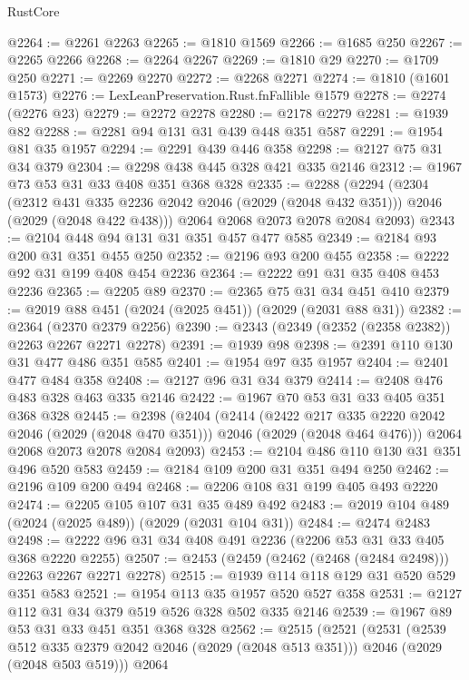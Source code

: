 \begin{lexlean}{RustCore}
\begin{coremodule}
@2264 := @2261 @2263
@2265 := @1810 @1569
@2266 := @1685 @250
@2267 := @2265 @2266
@2268 := @2264 @2267
@2269 := @1810 @29
@2270 := @1709 @250
@2271 := @2269 @2270
@2272 := @2268 @2271
@2274 := @1810 (@1601 @1573)
@2276 := LexLeanPreservation.Rust.fnFallible @1579
@2278 := @2274 (@2276 @23)
@2279 := @2272 @2278
@2280 := @2178 @2279
@2281 := @1939 @82
@2288 := @2281 @94 @131 @31 @439 @448 @351 @587
@2291 := @1954 @81 @35 @1957
@2294 := @2291 @439 @446 @358
@2298 := @2127 @75 @31 @34 @379
@2304 := @2298 @438 @445 @328 @421 @335 @2146
@2312 := @1967 @73 @53 @31 @33 @408 @351 @368 @328
@2335 := @2288
    (@2294
      (@2304
        (@2312 @431 @335 @2236 @2042 @2046 (@2029 (@2048 @432 @351)))
        @2046
        (@2029 (@2048 @422 @438)))
      @2064
      @2068
      @2073
      @2078
      @2084
      @2093)
@2343 := @2104 @448 @94 @131 @31 @351 @457 @477 @585
@2349 := @2184 @93 @200 @31 @351 @455 @250
@2352 := @2196 @93 @200 @455
@2358 := @2222 @92 @31 @199 @408 @454 @2236
@2364 := @2222 @91 @31 @35 @408 @453 @2236
@2365 := @2205 @89
@2370 := @2365 @75 @31 @34 @451 @410
@2379 := @2019 @88 @451 (@2024 (@2025 @451)) (@2029 (@2031 @88 @31))
@2382 := @2364 (@2370 @2379 @2256)
@2390 := @2343 (@2349 (@2352 (@2358 @2382)) @2263 @2267 @2271 @2278)
@2391 := @1939 @98
@2398 := @2391 @110 @130 @31 @477 @486 @351 @585
@2401 := @1954 @97 @35 @1957
@2404 := @2401 @477 @484 @358
@2408 := @2127 @96 @31 @34 @379
@2414 := @2408 @476 @483 @328 @463 @335 @2146
@2422 := @1967 @70 @53 @31 @33 @405 @351 @368 @328
@2445 := @2398
    (@2404
      (@2414
        (@2422 @217 @335 @2220 @2042 @2046 (@2029 (@2048 @470 @351)))
        @2046
        (@2029 (@2048 @464 @476)))
      @2064
      @2068
      @2073
      @2078
      @2084
      @2093)
@2453 := @2104 @486 @110 @130 @31 @351 @496 @520 @583
@2459 := @2184 @109 @200 @31 @351 @494 @250
@2462 := @2196 @109 @200 @494
@2468 := @2206 @108 @31 @199 @405 @493 @2220
@2474 := @2205 @105 @107 @31 @35 @489 @492
@2483 := @2019 @104 @489 (@2024 (@2025 @489)) (@2029 (@2031 @104 @31))
@2484 := @2474 @2483
@2498 := @2222 @96 @31 @34 @408 @491 @2236 (@2206 @53 @31 @33 @405 @368 @2220 @2255)
@2507 := @2453 (@2459 (@2462 (@2468 (@2484 @2498))) @2263 @2267 @2271 @2278)
@2515 := @1939 @114 @118 @129 @31 @520 @529 @351 @583
@2521 := @1954 @113 @35 @1957 @520 @527 @358
@2531 := @2127 @112 @31 @34 @379 @519 @526 @328 @502 @335 @2146
@2539 := @1967 @89 @53 @31 @33 @451 @351 @368 @328
@2562 := @2515
    (@2521
      (@2531
        (@2539 @512 @335 @2379 @2042 @2046 (@2029 (@2048 @513 @351)))
        @2046
        (@2029 (@2048 @503 @519)))
      @2064

\end{coremodule}
\end{lexlean}
